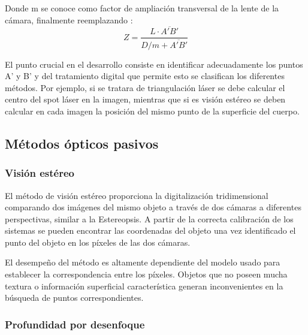 \documentclass[UTF8]{article}
\begin{document}
Donde m se conoce como factor de ampliación transversal de la lente de la cámara, finalmente reemplazando : 
\begin{equation}
Z = \frac{L\cdot\overline{A'B'}}{D/m+\overline{A'B'}}
\end{equation}
\medskip

El punto crucial en el desarrollo consiste en identificar adecuadamente los puntos A' y B' y del tratamiento digital que permite esto se clasifican los diferentes métodos. Por ejemplo, si se tratara de triangulación láser se debe calcular el centro del spot láser en la imagen, mientras que si es visión estéreo se deben calcular en cada imagen la posición del mismo punto de la superficie del cuerpo.

\medskip



\subsection{Métodos ópticos pasivos}

\subsubsection{Visión estéreo}

El método de visión estéreo proporciona la digitalización tridimensional comparando dos imágenes del mismo objeto a través de dos cámaras a diferentes perspectivas, similar a la Estereopsis. A partir de la correcta calibración de los sistemas se pueden encontrar las coordenadas del objeto una vez identificado el punto del objeto en los píxeles de las dos cámaras.

El desempeño del método es altamente dependiente del modelo usado para establecer la correspondencia entre los píxeles. Objetos que no poseen mucha textura o información superficial característica generan inconvenientes en la búsqueda de puntos correspondientes. 
\medskip

\subsubsection{Profundidad por desenfoque}
\end{document}

